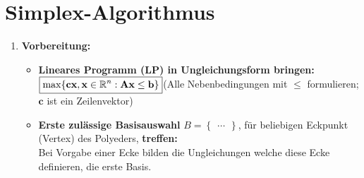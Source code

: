 \section{Simplex-Algorithmus}

\begin{enumerate}
\item \textbf{Vorbereitung:}\\
	\begin{itemize}
	\item \textbf{Lineares Programm (LP) in Ungleichungsform bringen:}\\
	$\boxed{\max\{\mathbf{c} \mathbf{x}, \mathbf{x}\in\mathbb{R}^n :\mathbf{Ax}\leq \mathbf{b}\}\\}$\quad(Alle Nebenbedingungen mit $\leq$ formulieren; $\mathbf{c}$ ist ein Zeilenvektor)
	\item \textbf{Erste zulässige Basisauswahl} $B=\begin{Bmatrix}\ldots\end{Bmatrix}$, für beliebigen Eckpunkt (Vertex) des Polyeders, \textbf{treffen:}\\
	Bei Vorgabe einer Ecke bilden die Ungleichungen welche diese Ecke definieren, die erste Basis.
	\end{itemize}
	
	\vspace{0.3cm}
	

\end{enumerate}
